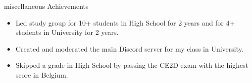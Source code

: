 \documentclass{resume} %
\begin{document}
\begin{rSection}{miscellaneous Achievements}
    \begin{itemize}
        \itemsep -3pt {}
        \item 	Led study group for 10+ students in High School for 2 years and for 4+ students in University for 2 years.
        \item   Created and moderated the main Discord server for my class in University. 
        \item	Skipped a grade in High School by passing the CE2D exam with the highest score in Belgium.
    \end{itemize}
\end{rSection}
\end{document}
